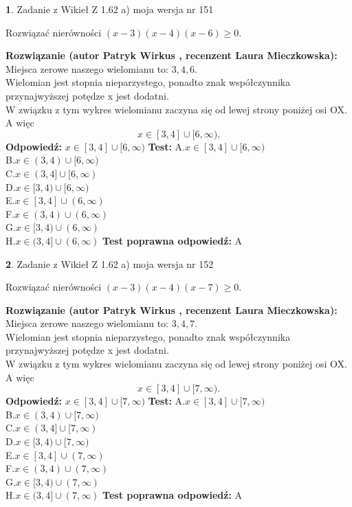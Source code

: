 \documentclass[12pt, a4paper]{article}
\theoremstyle{definition} %
\newtheorem{zad}{}
\newcommand{\zadStart}[1]{\begin{zad}#1\newline}
\newcommand{\zadStop}{\end{zad}}
\newcommand{\rozwStart}[2]{\noindent \textbf{Rozwiązanie (autor #1 , recenzent #2): }\newline}
\newcommand{\rozwStop}{\newline}
\newcommand{\odpStart}{\noindent \textbf{Odpowiedź:}\newline}
\newcommand{\odpStop}{\newline}
\newcommand{\testStart}{\noindent \textbf{Test:}\newline}
\newcommand{\testStop}{\newline}
\newcommand{\kluczStart}{\noindent \textbf{Test poprawna odpowiedź:}\newline}
\newcommand{\kluczStop}{\newline}
\begin{document}
\zadStart{Zadanie z Wikieł Z 1.62 a) moja wersja nr 151}

Rozwiązać nierówności $(x-3)(x-4)(x-6)\ge0$.
\zadStop
\rozwStart{Patryk Wirkus}{Laura Mieczkowska}
Miejsca zerowe naszego wielomianu to: $3, 4, 6$.\\
Wielomian jest stopnia nieparzystego, ponadto znak współczynnika przy\linebreak najwyższej potędze x jest dodatni.\\ W związku z tym wykres wielomianu zaczyna się od lewej strony poniżej osi OX. A więc $$x \in [3,4] \cup [6,\infty).$$
\rozwStop
\odpStart
$x \in [3,4] \cup [6,\infty)$
\odpStop
\testStart
A.$x \in [3,4] \cup [6,\infty)$\\
B.$x \in (3,4) \cup [6,\infty)$\\
C.$x \in (3,4] \cup [6,\infty)$\\
D.$x \in [3,4) \cup [6,\infty)$\\
E.$x \in [3,4] \cup (6,\infty)$\\
F.$x \in (3,4) \cup (6,\infty)$\\
G.$x \in [3,4) \cup (6,\infty)$\\
H.$x \in (3,4] \cup (6,\infty)$
\testStop
\kluczStart
A
\kluczStop



\zadStart{Zadanie z Wikieł Z 1.62 a) moja wersja nr 152}

Rozwiązać nierówności $(x-3)(x-4)(x-7)\ge0$.
\zadStop
\rozwStart{Patryk Wirkus}{Laura Mieczkowska}
Miejsca zerowe naszego wielomianu to: $3, 4, 7$.\\
Wielomian jest stopnia nieparzystego, ponadto znak współczynnika przy\linebreak najwyższej potędze x jest dodatni.\\ W związku z tym wykres wielomianu zaczyna się od lewej strony poniżej osi OX. A więc $$x \in [3,4] \cup [7,\infty).$$
\rozwStop
\odpStart
$x \in [3,4] \cup [7,\infty)$
\odpStop
\testStart
A.$x \in [3,4] \cup [7,\infty)$\\
B.$x \in (3,4) \cup [7,\infty)$\\
C.$x \in (3,4] \cup [7,\infty)$\\
D.$x \in [3,4) \cup [7,\infty)$\\
E.$x \in [3,4] \cup (7,\infty)$\\
F.$x \in (3,4) \cup (7,\infty)$\\
G.$x \in [3,4) \cup (7,\infty)$\\
H.$x \in (3,4] \cup (7,\infty)$
\testStop
\kluczStart
A
\kluczStop
\end{document}

